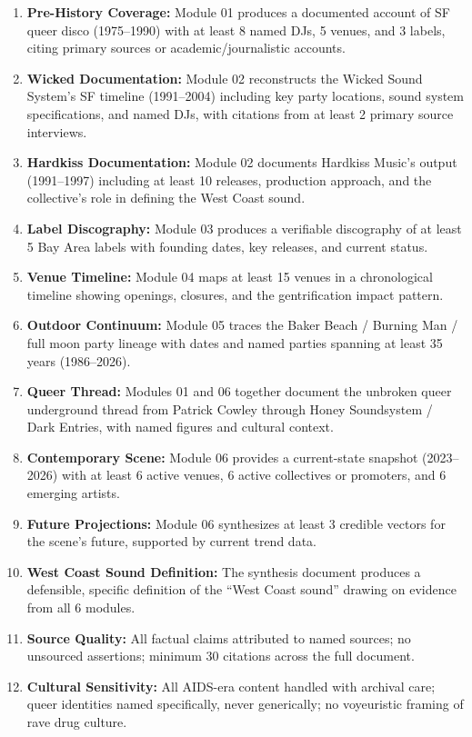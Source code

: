 \documentclass[11pt,letterpaper]{article}
\begin{document}
\begin{enumerate}
  \item \textbf{Pre-History Coverage:} Module 01 produces a documented account of SF queer disco (1975--1990) with at least 8 named DJs, 5 venues, and 3 labels, citing primary sources or academic/journalistic accounts.
  \item \textbf{Wicked Documentation:} Module 02 reconstructs the Wicked Sound System's SF timeline (1991--2004) including key party locations, sound system specifications, and named DJs, with citations from at least 2 primary source interviews.
  \item \textbf{Hardkiss Documentation:} Module 02 documents Hardkiss Music's output (1991--1997) including at least 10 releases, production approach, and the collective's role in defining the West Coast sound.
  \item \textbf{Label Discography:} Module 03 produces a verifiable discography of at least 5 Bay Area labels with founding dates, key releases, and current status.
  \item \textbf{Venue Timeline:} Module 04 maps at least 15 venues in a chronological timeline showing openings, closures, and the gentrification impact pattern.
  \item \textbf{Outdoor Continuum:} Module 05 traces the Baker Beach / Burning Man / full moon party lineage with dates and named parties spanning at least 35 years (1986--2026).
  \item \textbf{Queer Thread:} Modules 01 and 06 together document the unbroken queer underground thread from Patrick Cowley through Honey Soundsystem / Dark Entries, with named figures and cultural context.
  \item \textbf{Contemporary Scene:} Module 06 provides a current-state snapshot (2023--2026) with at least 6 active venues, 6 active collectives or promoters, and 6 emerging artists.
  \item \textbf{Future Projections:} Module 06 synthesizes at least 3 credible vectors for the scene's future, supported by current trend data.
  \item \textbf{West Coast Sound Definition:} The synthesis document produces a defensible, specific definition of the ``West Coast sound'' drawing on evidence from all 6 modules.
  \item \textbf{Source Quality:} All factual claims attributed to named sources; no unsourced assertions; minimum 30 citations across the full document.
  \item \textbf{Cultural Sensitivity:} All AIDS-era content handled with archival care; queer identities named specifically, never generically; no voyeuristic framing of rave drug culture.
\end{enumerate}
\end{document}
